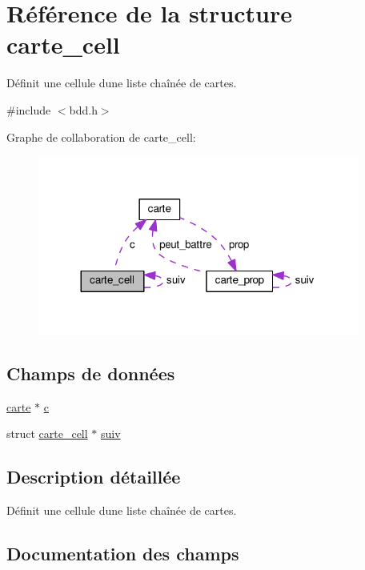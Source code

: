 \hypertarget{structcarte__cell}{}\section{Référence de la structure carte\+\_\+cell}
\label{structcarte__cell}


Définit une cellule d\textquotesingle{}une liste chaînée de cartes.  




{\ttfamily \#include $<$bdd.\+h$>$}



Graphe de collaboration de carte\+\_\+cell\+:\nopagebreak
\begin{figure}[H]
\begin{center}
\leavevmode
\includegraphics[width=300pt]{structcarte__cell__coll__graph}
\end{center}
\end{figure}
\subsection*{Champs de données}
\begin{DoxyCompactItemize}
\item 
\hyperlink{structcarte}{carte} $\ast$ \hyperlink{structcarte__cell_a2c4496b232d881213e41fe630c3843bb}{c}
\item 
struct \hyperlink{structcarte__cell}{carte\+\_\+cell} $\ast$ \hyperlink{structcarte__cell_aa9b3e04e481fb482711d5d66e4e45924}{suiv}
\end{DoxyCompactItemize}


\subsection{Description détaillée}
Définit une cellule d\textquotesingle{}une liste chaînée de cartes. 

\subsection{Documentation des champs}
